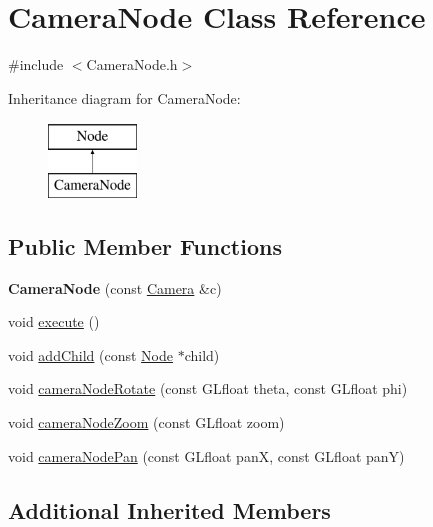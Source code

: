 \hypertarget{classCameraNode}{\section{Camera\-Node Class Reference}
\label{classCameraNode}
}


{\ttfamily \#include $<$Camera\-Node.\-h$>$}

Inheritance diagram for Camera\-Node\-:\begin{figure}[H]
\begin{center}
\leavevmode
\includegraphics[height=2.000000cm]{classCameraNode}
\end{center}
\end{figure}
\subsection*{Public Member Functions}
\begin{DoxyCompactItemize}
\item 
\hypertarget{classCameraNode_a9975897c31197e56a4ea5bf7e0fb6f7a}{{\bfseries Camera\-Node} (const \hyperlink{classCamera}{Camera} \&c)}\label{classCameraNode_a9975897c31197e56a4ea5bf7e0fb6f7a}

\item 
void \hyperlink{classCameraNode_afc9b202cd080ee7e3a62e4e5676ab8a6}{execute} ()
\item 
void \hyperlink{classCameraNode_ad87fec242725e3eeb0546b8bfe8df6b7}{add\-Child} (const \hyperlink{classNode}{Node} $\ast$child)
\item 
void \hyperlink{classCameraNode_ae800e4fab63b5d3f9762a5532ffc201a}{camera\-Node\-Rotate} (const G\-Lfloat theta, const G\-Lfloat phi)
\item 
void \hyperlink{classCameraNode_adb8b1de4bcc623e2e4eebb4f4fd77e86}{camera\-Node\-Zoom} (const G\-Lfloat zoom)
\item 
void \hyperlink{classCameraNode_a994a0e7f079982f87d8470919fd3aea7}{camera\-Node\-Pan} (const G\-Lfloat pan\-X, const G\-Lfloat pan\-Y)
\end{DoxyCompactItemize}
\subsection*{Additional Inherited Members}


